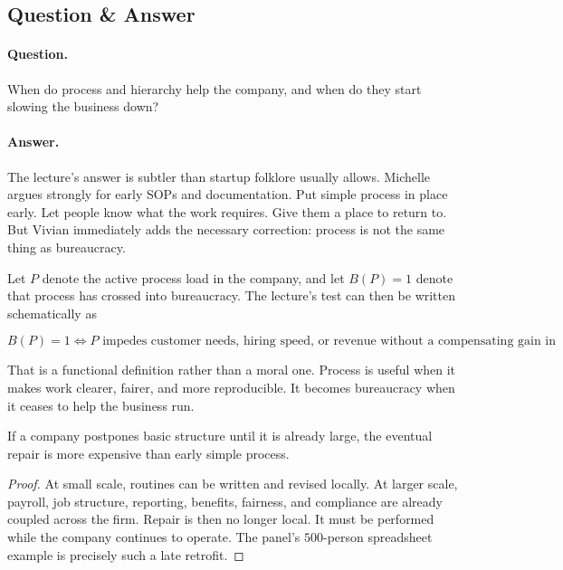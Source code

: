 \subsection{Question \& Answer}

\paragraph{Question.} When do process and hierarchy help the company, and when do they start slowing the business down?

\paragraph{Answer.} The lecture's answer is subtler than startup folklore usually allows. Michelle argues strongly for early SOPs and documentation. Put simple process in place early. Let people know what the work requires. Give them a place to return to. But Vivian immediately adds the necessary correction: process is not the same thing as bureaucracy.

Let \(P\) denote the active process load in the company, and let \(B(P)=1\) denote that process has crossed into bureaucracy. The lecture's test can then be written schematically as

\begin{equation}
B(P)=1
\iff
P \text{ impedes customer needs, hiring speed, or revenue without a compensating gain in clarity, fairness, or compliance.}
\end{equation}

That is a functional definition rather than a moral one. Process is useful when it makes work clearer, fairer, and more reproducible. It becomes bureaucracy when it ceases to help the business run.

\begin{proposition}
If a company postpones basic structure until it is already large, the eventual repair is more expensive than early simple process.
\end{proposition}

\begin{proof}
At small scale, routines can be written and revised locally. At larger scale, payroll, job structure, reporting, benefits, fairness, and compliance are already coupled across the firm. Repair is then no longer local. It must be performed while the company continues to operate. The panel's \(500\)-person spreadsheet example is precisely such a late retrofit.
\end{proof}

